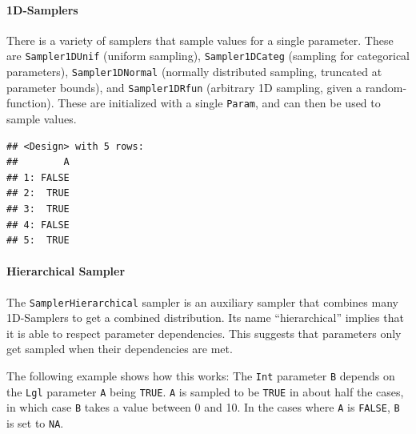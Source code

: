 \documentclass[
]{scrbook}
\newenvironment{Shaded}{\begin{snugshade}}{\end{snugshade}}
\newcommand{\DecValTok}[1]{\textcolor[rgb]{0.00,0.00,0.81}{#1}}
\newcommand{\FunctionTok}[1]{\textcolor[rgb]{0.00,0.00,0.00}{#1}}
\newcommand{\NormalTok}[1]{#1}
\newcommand{\OtherTok}[1]{\textcolor[rgb]{0.56,0.35,0.01}{#1}}
\newcommand{\SpecialCharTok}[1]{\textcolor[rgb]{0.00,0.00,0.00}{#1}}
\renewenvironment{Shaded} {\begin{snugshade}\small} {\end{snugshade}}
\begin{document}
\hypertarget{d-samplers}{%
\paragraph{1D-Samplers}\label{d-samplers}}

There is a variety of samplers that sample values for a single parameter.
These are \texttt{Sampler1DUnif} (uniform sampling), \texttt{Sampler1DCateg} (sampling for categorical parameters), \texttt{Sampler1DNormal} (normally distributed sampling, truncated at parameter bounds), and \texttt{Sampler1DRfun} (arbitrary 1D sampling, given a random-function).
These are initialized with a single \texttt{Param}, and can then be used to sample values.

\begin{Shaded}
\end{Shaded}

\begin{verbatim}
## <Design> with 5 rows:
##        A
## 1: FALSE
## 2:  TRUE
## 3:  TRUE
## 4: FALSE
## 5:  TRUE
\end{verbatim}

\hypertarget{hierarchical-sampler}{%
\paragraph{Hierarchical Sampler}\label{hierarchical-sampler}}

The \texttt{SamplerHierarchical} sampler is an auxiliary sampler that combines many 1D-Samplers to get a combined distribution.
Its name ``hierarchical'' implies that it is able to respect parameter dependencies.
This suggests that parameters only get sampled when their dependencies are met.

The following example shows how this works: The \texttt{Int} parameter \texttt{B} depends on the \texttt{Lgl} parameter \texttt{A} being \texttt{TRUE}.
\texttt{A} is sampled to be \texttt{TRUE} in about half the cases, in which case \texttt{B} takes a value between 0 and 10.
In the cases where \texttt{A} is \texttt{FALSE}, \texttt{B} is set to \texttt{NA}.
\end{document}
